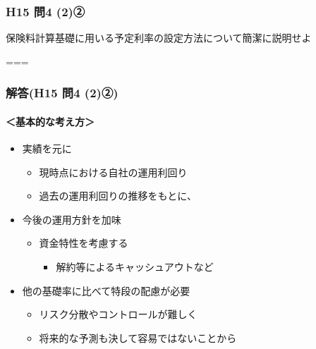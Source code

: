 \documentclass[
]{article}
\providecommand{\tightlist}{%
  \setlength{\itemsep}{0pt}\setlength{\parskip}{0pt}}
\begin{document}
\hypertarget{h15-ux554f4-2ux2461}{%
\subsubsection{H15 問4 (2)②}\label{h15-ux554f4-2ux2461}}

保険料計算基礎に用いる予定利率の設定方法について簡潔に説明せよ

===

\hypertarget{ux89e3ux7b54h15-ux554f4-2ux2461}{%
\subsubsection{解答(H15 問4
(2)②)}\label{ux89e3ux7b54h15-ux554f4-2ux2461}}

\hypertarget{ux57faux672cux7684ux306aux8003ux3048ux65b9}{%
\paragraph{＜基本的な考え方＞}\label{ux57faux672cux7684ux306aux8003ux3048ux65b9}}

\begin{itemize}
\tightlist
\item
  実績を元に

  \begin{itemize}
  \tightlist
  \item
    現時点における自社の運用利回り
  \item
    過去の運用利回りの推移をもとに、
  \end{itemize}
\item
  今後の運用方針を加味

  \begin{itemize}
  \tightlist
  \item
    資金特性を考慮する

    \begin{itemize}
    \tightlist
    \item
      解約等によるキャッシュアウトなど
    \end{itemize}
  \end{itemize}
\item
  他の基礎率に比べて特段の配慮が必要

  \begin{itemize}
  \tightlist
  \item
    リスク分散やコントロールが難しく
  \item
    将来的な予測も決して容易ではないことから
  \end{itemize}
\end{itemize}
\end{document}
